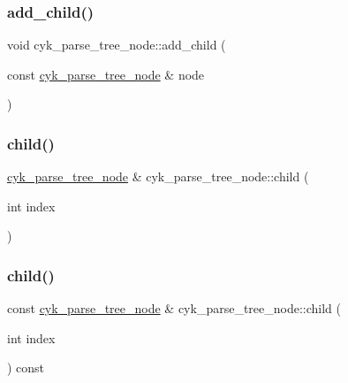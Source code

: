 \subsubsection{\texorpdfstring{add\_child()}{add\_child()}}
{\footnotesize\ttfamily void cyk\+\_\+parse\+\_\+tree\+\_\+node\+::add\+\_\+child (\begin{DoxyParamCaption}\item[{const \mbox{\hyperlink{classcyk__parse__tree__node}{cyk\+\_\+parse\+\_\+tree\+\_\+node}} \&}]{node }\end{DoxyParamCaption})}

\mbox{\label{classcyk__parse__tree__node_a5b8c50139dff519bde5eaea7038a6908}} 
\subsubsection{\texorpdfstring{child()}{child()}\hspace{0.1cm}{\footnotesize\ttfamily [1/2]}}
{\footnotesize\ttfamily \mbox{\hyperlink{classcyk__parse__tree__node}{cyk\+\_\+parse\+\_\+tree\+\_\+node}} \& cyk\+\_\+parse\+\_\+tree\+\_\+node\+::child (\begin{DoxyParamCaption}\item[{int}]{index }\end{DoxyParamCaption})}

\mbox{\label{classcyk__parse__tree__node_a0bb50917b8d92e1d2f7a4748612d2f6e}} 
\subsubsection{\texorpdfstring{child()}{child()}\hspace{0.1cm}{\footnotesize\ttfamily [2/2]}}
{\footnotesize\ttfamily const \mbox{\hyperlink{classcyk__parse__tree__node}{cyk\+\_\+parse\+\_\+tree\+\_\+node}} \& cyk\+\_\+parse\+\_\+tree\+\_\+node\+::child (\begin{DoxyParamCaption}\item[{int}]{index }\end{DoxyParamCaption}) const}

\mbox{\label{classcyk__parse__tree__node_aefb9b424e58a670b1ac368fcf86b7512}} 
